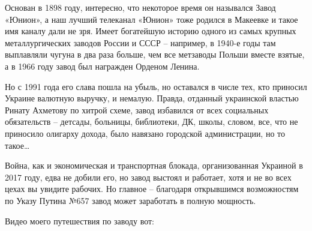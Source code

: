 
Основан в 1898 году, интересно, что некоторое время он назывался Завод «Юнион»,
а наш лучший телеканал «Юнион» тоже родился в Макеевке и такое имя каналу дали
не зря. Имеет богатейшую историю одного из самых крупных металлургических
заводов России и СССР – например, в 1940-е годы там выплавляли чугуна в два
раза больше, чем все метзаводы Польши вместе взятые, а в 1966 году завод был
награжден Орденом Ленина.

Но с 1991 года его слава пошла на убыль, но оставался в числе тех, кто приносил
Украине валютную выручку, и немалую. Правда, отданный украинской властью Ринату
Ахметову по хитрой схеме, завод избавился от всех социальных обязательств –
детсады, больницы, библиотеки, ДК, школы, словом, все, что не приносило
олигарху дохода, было навязано городской администрации, но то такое…

Война, как и экономическая и транспортная блокада, организованная Украиной в
2017 году, едва не добили его, но завод выстоял и работает, хотя и не во всех
цехах вы увидите рабочих. Но главное – благодаря открывшимся возможностям по
Указу Путина №657 завод может заработать в полную мощность.

Видео моего путешествия по заводу вот:
